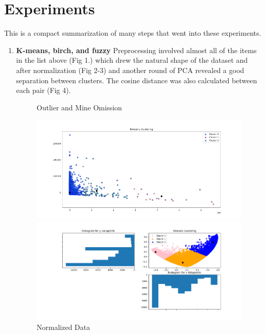 \documentclass[11pt, fullpage,letterpaper]{article}
\begin{document}
\section{Experiments}
\begin{flushleft}
    This is a compact summarization of many steps that went into these experiments.
    \begin{enumerate}
        \item \textbf{K-means, birch, and fuzzy} Preprocessing involved almost all of the items
        in the list above (Fig 1.) which drew the natural shape of the dataset and after normalization (Fig 2-3)
        and another round of PCA revealed a good separation between clusters. The cosine distance
        was also calculated between each pair (Fig 4).
        \break
        \begin{figure}
            \begin{minipage}{0.5\textwidth}
                \caption{Outlier and Mine Omission}
                \includegraphics[scale=1.0]{ga1}
            \end{minipage}
            \begin{minipage}{0.5\textwidth}
                \caption{Normalized Data}
                \includegraphics[scale=1.0]{ga2}
            \end{minipage}

\end{figure}
\end{enumerate}
\end{flushleft}
\end{document}
